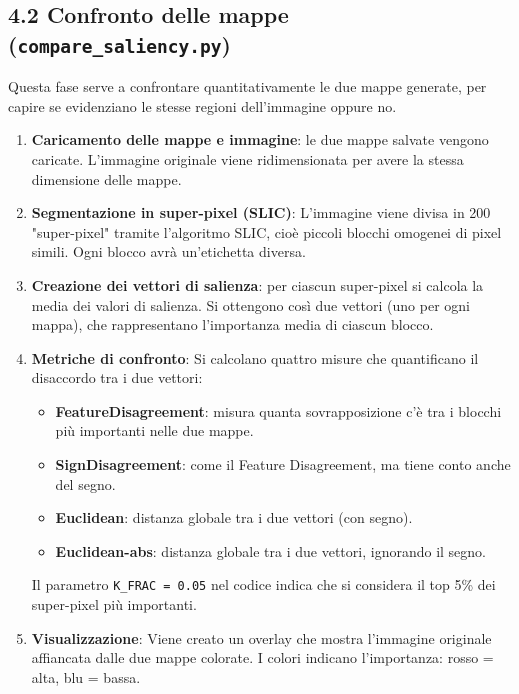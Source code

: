 \documentclass[a4paper,11pt]{article}
\begin{document}
\subsection*{4.2 Confronto delle mappe (\texttt{compare\_saliency.py})}
Questa fase serve a confrontare quantitativamente le due mappe generate, per capire se evidenziano le stesse regioni dell'immagine oppure no.

\begin{enumerate}
\item \textbf{Caricamento delle mappe e immagine}: le due mappe salvate vengono caricate. L'immagine originale viene ridimensionata per avere la stessa dimensione delle mappe.

\item \textbf{Segmentazione in super-pixel (SLIC)}:
L'immagine viene divisa in 200 "super-pixel" tramite l'algoritmo SLIC, cioè piccoli blocchi omogenei di pixel simili. Ogni blocco avrà un'etichetta diversa.

\item \textbf{Creazione dei vettori di salienza}: per ciascun super-pixel si calcola la media dei valori di salienza. Si ottengono così due vettori (uno per ogni mappa), che rappresentano l'importanza media di ciascun blocco.

\item \textbf{Metriche di confronto}:
Si calcolano quattro misure che quantificano il disaccordo tra i due vettori:
\begin{itemize}
\item \textbf{FeatureDisagreement}: misura quanta sovrapposizione c'è tra i blocchi più importanti nelle due mappe.
\item \textbf{SignDisagreement}: come il Feature Disagreement, ma tiene conto anche del segno.
\item \textbf{Euclidean}: distanza globale tra i due vettori (con segno).
\item \textbf{Euclidean-abs}: distanza globale tra i due vettori, ignorando il segno.
\end{itemize}
Il parametro \texttt{K\_FRAC = 0.05} nel codice indica che si considera il top 5\% dei super-pixel più importanti.

\item \textbf{Visualizzazione}:
Viene creato un overlay che mostra l'immagine originale affiancata dalle due mappe colorate. I colori indicano l'importanza: rosso = alta, blu = bassa.
\end{enumerate}
\end{document}
